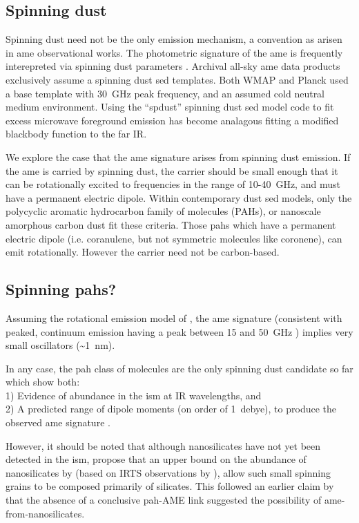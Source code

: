     \subsection{Spinning dust}
     Spinning dust need not be the only emission mechanism, a convention as arisen in \acrshort{ame} observational works. The photometric signature of the \acrshort{ame} is frequently interepreted via spinning dust parameters \citep{ysard11,ali-haimoud10}. Archival all-sky \acrshort{ame} data products exclusively assume a spinning dust \acrshort{sed} templates. Both WMAP and Planck used a base template with 30~GHz peak frequency, and an assumed cold neutral medium environment. Using the ``spdust'' spinning dust \acrshort{sed} model code to fit excess microwave foreground emission has become analagous fitting a modified blackbody function to the far IR.

      We explore the case that the \acrshort{ame} signature arises from spinning dust emission. If the \acrshort{ame} is carried by spinning dust, the carrier should be small enough that it can be rotationally excited to frequencies in the range of 10-40~GHz, and must have a permanent electric dipole. Within contemporary dust \acrshort{sed} models, only the polycyclic aromatic hydrocarbon family of molecules (PAHs), or nanoscale amorphous carbon dust fit these criteria. Those \acrshort{pah}s which have a permanent electric dipole (i.e. coranulene, but not symmetric molecules like coronene), can emit rotationally. However the carrier need not be carbon-based.

     \subsection{Spinning \acrshort{pah}s?}
       Assuming the rotational emission model of \cite{draine98b}, the \acrshort{ame} signature (consistent with peaked, continuum emission having a peak between 15 and 50~GHz ) implies very small oscillators (\textasciitilde{}1~nm).

       In any case, the \acrshort{pah} class of molecules are the only spinning dust candidate so far which show both: \\
       1) Evidence of abundance in the \acrshort{ism} at IR wavelengths, and \\
       2) A predicted range of dipole moments (on order of 1~debye), to produce the observed \acrshort{ame} signature \citep{draine98b, lovas05, thorwirth07}.

       However, it should be noted that although nanosilicates have not yet been detected in the \acrshort{ism}, \cite{hensley17a} propose that an upper bound on the abundance of nanosilicates by \cite{li01} (based on IRTS observations by \cite{onaka96}), allow such small spinning grains to be composed primarily of silicates. This followed an earlier claim by \cite{henley16} that the absence of a conclusive \acrshort{pah}-AME link suggested the possibility of \acrshort{ame}-from-nanosilicates.

